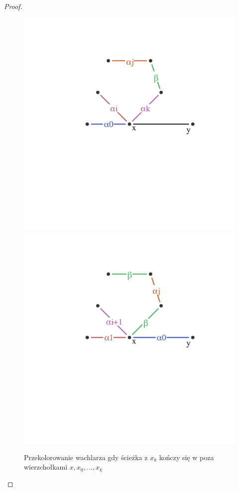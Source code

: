 \begin{proof}
\begin{enumerate}
		      \begin{figure}[H]
			      \centering
			      \includegraphics[scale=0.45]{images/vizing/fan_case_one_before.png}
			      \includegraphics[scale=0.45]{images/vizing/fan_case_one_after.png}
			      \caption{Przekolorowanie wachlarza gdy ścieżka z $x_k$ kończy się w poza wierzchołkami $x, x_0, ..., x_k$}
		      \end{figure}


\end{enumerate}
\end{proof}
